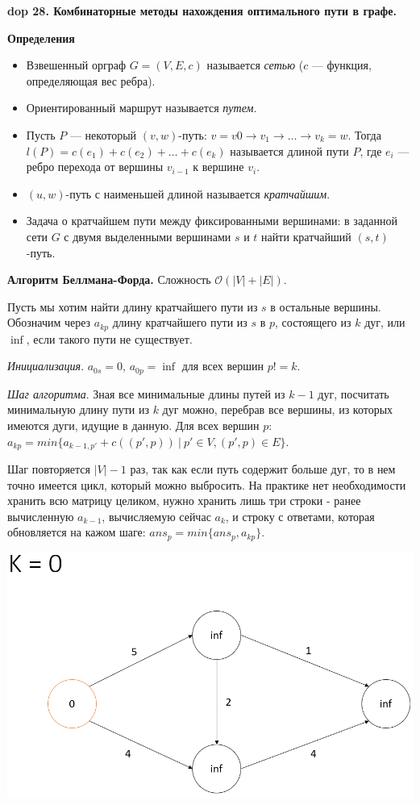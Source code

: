 \textbf{\LARGE dop 28. Комбинаторные методы нахождения оптимального пути в графе.}

\textbf{Определения}

\begin{itemize}
    \item Взвешенный орграф $G = (V, E, c)$ называется \textit{сетью} ($c$ --- функция, определяющая вес ребра).
    \item Ориентированный маршрут называется \textit{путем}. 
    \item Пусть $P$ --- некоторый $(v, w)$-путь: $v = v 0 \rightarrow v_1 \rightarrow \dots \rightarrow v_k = w$. Тогда $l(P) = c(e_1) + c(e_2) + \dots + c(e_k)$ называется длиной пути $P$, где $e_i$ --- ребро перехода от вершины $v_{i-1}$ к вершине $v_i$. 
    \item $(u, w)$-путь с наименьшей длиной называется \textit{кратчайшим}.
    \item Задача о кратчайшем пути между фиксированными вершинами: в заданной сети $G$ с двумя выделенными вершинами $s$ и $t$ найти кратчайший $(s, t)$-путь.
\end{itemize}

\textbf{Алгоритм Беллмана-Форда.} 
Сложность $\mathcal{O}(|V| + |E|)$.

Пусть мы хотим найти длину кратчайшего пути из $s$ в остальные вершины. Обозначим через $a_{kp}$ длину кратчайшего пути из $s$ в $p$, состоящего из $k$ дуг, или $\inf$, если такого пути не существует.

\textit{Инициализация}. 
$a_{0s} = 0$, $a_{0p} = \inf$ для всех вершин $p != k$.

\textit{Шаг алгоритма}.
Зная все минимальные длины путей из $k-1$ дуг, посчитать минимальную длину пути из $k$ дуг можно, перебрав все вершины, из которых имеются дуги, идущие в данную. Для всех вершин $p$: $a_{kp} = min\{a_{k-1,p'} + c((p',p))~|~p' \in V, (p',p) \in E\}$. 

Шаг повторяется $|V| - 1$ раз, так как если путь содержит больше дуг, то в нем точно имеется цикл, который можно выбросить. На практике нет необходимости хранить всю матрицу целиком, нужно хранить лишь три строки - ранее вычисленную $a_{k-1}$, вычисляемую сейчас $a_k$, и строку с ответами, которая обновляется на кажом шаге: $ans_p = min\{ans_p, a_{kp}\}$.

\includegraphics[width=0.9\columnwidth]{pics/dop28_1.png}

